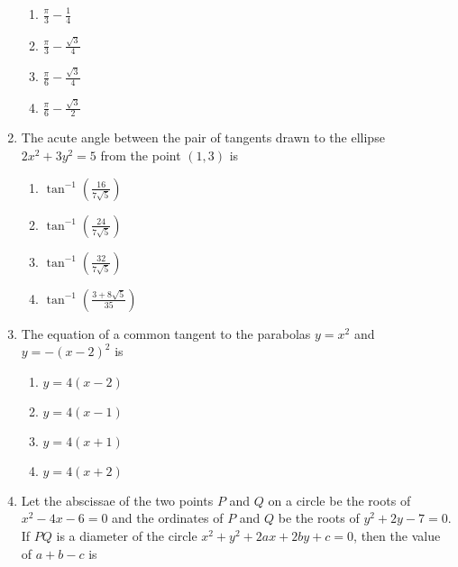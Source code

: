 \documentclass[journal]{IEEEtran}
\newcommand{\brak}[1]{\left( #1 \right)}
\begin{document}
\begin{enumerate}
        \begin{multicols}{4}
        \begin{enumerate}
        \item $\frac{\pi}{3} - \frac{1}{4}$
        \item $\frac{\pi}{3} - \frac{\sqrt{3}}{4}$
        \item $\frac{\pi}{6} - \frac{\sqrt{3}}{4}$
        \item $\frac{\pi}{6} - \frac{\sqrt{3}}{2}$
        \end{enumerate}
        \end{multicols}
                        
    \item The acute angle between the pair of tangents drawn to the ellipse $2x^{2} + 3y^{2} = 5$ from the point $\brak{1, 3}$ is

        \begin{multicols}{4}
        \begin{enumerate}
        \item $\tan^{-1} \brak{\frac{16}{7\sqrt{5}}}$
        \item $\tan^{-1} \brak{\frac{24}{7\sqrt{5}}}$
        \item $\tan^{-1} \brak{\frac{32}{7\sqrt{5}}}$
        \item $\tan^{-1} \brak{\frac{3 + 8\sqrt{5}}{35}}$
        \end{enumerate}
        \end{multicols}

    \item The equation of a common tangent to the parabolas $y = x^{2}$ and $y = -\brak{x - 2}^{2}$ is

        \begin{multicols}{4}
        \begin{enumerate}
        \item $y = 4 \brak{x - 2}$
        \item $y = 4 \brak{x - 1}$
        \item $y = 4 \brak{x + 1}$
        \item $y = 4 \brak{x + 2}$
        \end{enumerate}
        \end{multicols}
        
    \item Let the abscissae of the two points $P$ and $Q$ on a circle be the roots of $x^{2} - 4x - 6 = 0$ and the ordinates of $P$ and $Q$ be the roots of $y^{2} + 2y - 7 = 0$. If $PQ$ is a diameter of the circle $x^{2} + y^{2} + 2ax + 2by + c = 0$, then the value of $a + b - c$ is


\end{enumerate}
\end{document}
